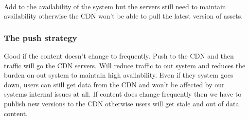 \paragraph{}
Add to the availability of the system but the servers still need to maintain availability otherwise the CDN won't be able to pull the latest version of assets.

\subsubsection{The push strategy}
Good if the content doesn't change to frequently.
Push to the CDN and then traffic will go the CDN servers.
Will reduce traffic to out system and reduces the burden on out system to maintain high availability.
Even if they system goes down, users can still get data from the CDN and won't be affected by our systems internal issues at all.
If content does change frequently then we have to publish new versions to the CDN otherwise users will get stale and out of data content.